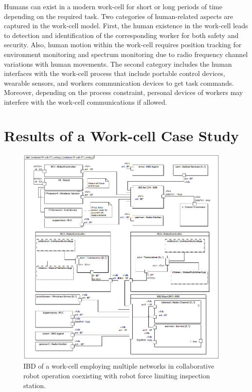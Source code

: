 Humans can exist in a modern work-cell for short or long periods of time depending on the required task. Two categories of human-related aspects are captured in the work-cell model. First, the human existence in the work-cell leads to detection and identification of the corresponding worker for both safety and security. Also, human motion within the work-cell requires position tracking for environment monitoring and spectrum monitoring due to radio frequency channel variations with human movements. The second category includes the human interfaces with the work-cell process that include portable control devices, wearable sensors, and workers communication devices to get task commands. Moreover, depending on the process constraint, personal devices of workers may interfere with the work-cell communications if allowed.      

\section{Results of a Work-cell Case Study}\label{sysml:sec:wireless-infoflows}
\begin{figure}[tbp]
	\centering
	\includegraphics[width=0.95\textwidth]{./chapter-sysml/diagrams/ibd__Combined_PP_with_FT_Limiting__Combined_PP_with_FT_Limiting}
	\caption{IBD of a work-cell employing multiple networks in collaborative robot operation coexisting with robot force limiting inspection station.}
	\label{sysml:fig:workcell:examples}     
\end{figure}

